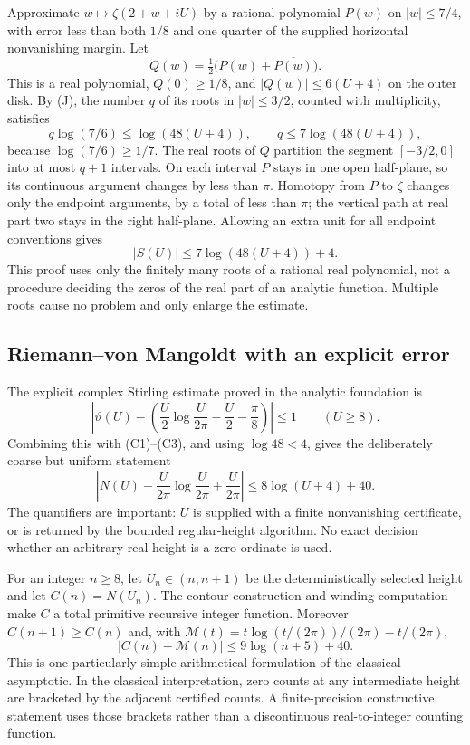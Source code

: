 Approximate $w\mapsto\zeta(2+w+iU)$ by a rational polynomial $P(w)$
on $|w|\le7/4$, with error less than both $1/8$ and one quarter of the
supplied horizontal nonvanishing margin.  Let
\[
 Q(w)=\tfrac12\bigl(P(w)+\overline{P(\overline w)}\bigr).
\]
This is a real polynomial, $Q(0)\ge1/8$, and
$|Q(w)|\le6(U+4)$ on the outer disk.  By (J), the number $q$ of its
roots in $|w|\le3/2$, counted with multiplicity, satisfies
\[
 q\log(7/6)\le\log(48(U+4)),\qquad
 q\le7\log(48(U+4)),                                   \tag{C2}
\]
because $\log(7/6)\ge1/7$.
The real roots of $Q$ partition the segment $[-3/2,0]$ into at most
$q+1$ intervals.  On each interval $P$ stays in one open half-plane, so its
continuous argument changes by less than $\pi$.
Homotopy from $P$ to $\zeta$ changes only the endpoint arguments, by a
total of less than $\pi$; the vertical path at real part two stays in the
right half-plane.  Allowing an extra unit for all endpoint conventions gives
\[
 |S(U)|\le7\log(48(U+4))+4.                             \tag{C3}
\]
This proof uses only the finitely many roots of a rational real polynomial,
not a procedure deciding the zeros of the real part of an analytic
function.  Multiple roots cause no problem and only enlarge the estimate.

\subsection{Riemann--von Mangoldt with an explicit error}

The explicit complex Stirling estimate proved in the analytic foundation is
\[
 \left|\vartheta(U)-\left(\frac U2\log\frac U{2\pi}
                    -\frac U2-\frac\pi8\right)\right|
 \le1\qquad(U\ge8).
\]
Combining this with (C1)--(C3), and using $\log48<4$, gives the deliberately
coarse but uniform statement
\[
 \boxed{\quad
 \left|N(U)-\frac U{2\pi}\log\frac U{2\pi}
                 +\frac U{2\pi}\right|
 \le8\log(U+4)+40.
 \quad}                                                 \tag{RVM}
\]
The quantifiers are important: $U$ is supplied with a finite nonvanishing
certificate, or is returned by the bounded regular-height algorithm.
No exact decision whether an arbitrary real height is a zero ordinate is
used.

For an integer $n\ge8$, let $U_n\in(n,n+1)$ be the deterministically
selected height and let $C(n)=N(U_n)$.  The contour construction and winding
computation make $C$ a total primitive recursive integer function.
Moreover $C(n+1)\ge C(n)$ and, with
$\mathcal M(t)=t\log(t/(2\pi))/(2\pi)-t/(2\pi)$,
\[
 |C(n)-\mathcal M(n)|\le9\log(n+5)+40.                           \tag{RVM-PR}
\]
This is one particularly simple arithmetical formulation of the classical
asymptotic.  In the classical interpretation, zero counts at any intermediate
height are bracketed by the adjacent certified counts.  A finite-precision
constructive statement uses those brackets rather than a discontinuous
real-to-integer counting function.

